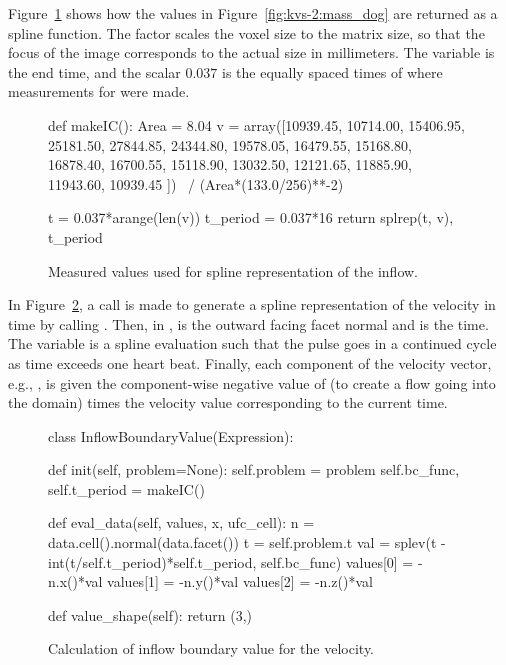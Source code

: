 Figure~\ref{fig:kvs-2:inflow_codeI} shows how the values in
Figure~\ref{fig:kvs-2:mass_dog} are returned as a spline function. The
factor  scales the voxel size to the matrix size,
so that the focus of the image corresponds to the actual size in
millimeters. The  variable is the end time, and the scalar
$0.037$ is the equally spaced times of where measurements for 
were made.

\begin{figure}
\bwfig
\begin{python}
def makeIC():
    Area = 8.04
    v = array([10939.45, 10714.00, 15406.95,
               25181.50, 27844.85, 24344.80,
               19578.05, 16479.55, 15168.80,
               16878.40, 16700.55, 15118.90,
               13032.50, 12121.65, 11885.90,
               11943.60, 10939.45 ]) \
                     / (Area*(133.0/256)**-2)

    t = 0.037*arange(len(v))
    t_period = 0.037*16
    return splrep(t, v), t_period
\end{python}
\caption{Measured values used for spline representation of the inflow.}
\label{fig:kvs-2:inflow_codeI}
\vspace*{-12pt}
\end{figure}

In Figure~\ref{fig:kvs-2:inflow_codeII}, a call is made to generate a spline
representation of the velocity in time by calling \emp{makeIC()}.
Then, in \emp{eval\_data}, \emp{n} is the outward facing facet normal
and \emp{t} is the time. The variable \emp{val} is a spline evaluation
such that the pulse goes in a continued cycle as time exceeds one
heart beat. Finally, each component of the velocity vector, e.g.,
\emp{values[0]}, is given the component-wise negative value of 
(to create a flow going into the domain) times the velocity value
corresponding to the current time.

\begin{figure}
\bwfig
\begin{python}
class InflowBoundaryValue(Expression):

    def init(self, problem=None):
        self.problem = problem
        self.bc_func, self.t_period = makeIC()

    def eval_data(self, values, x, ufc_cell):
        n = data.cell().normal(data.facet())
        t = self.problem.t
        val = splev(t - int(t/self.t_period)*self.t_period, self.bc_func)
        values[0] = -n.x()*val
        values[1] = -n.y()*val
        values[2] = -n.z()*val

    def value_shape(self):
        return (3,)
\end{python}
\caption{Calculation of inflow boundary value for the velocity.}
\label{fig:kvs-2:inflow_codeII}
\end{figure}


